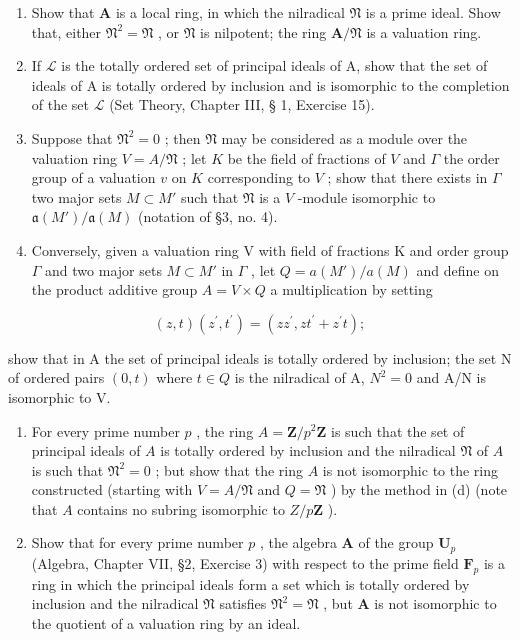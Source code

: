 \begin{enumerate}
\def\labelenumi{(\alph{enumi})}
\item
  Show that \(\mathbf{A}\) is a local ring, in which the nilradical \(\mathfrak{N}\) is a prime ideal. Show that, either \(\mathfrak{N}^2 = \mathfrak{N}\) , or \(\mathfrak{N}\) is nilpotent; the ring \(\mathbf{A} / \mathfrak{N}\) is a valuation ring.
\item
  If \(\mathcal{L}\) is the totally ordered set of principal ideals of A, show that the set of ideals of A is totally ordered by inclusion and is isomorphic to the completion of the set \(\mathcal{L}\) (Set Theory, Chapter III, § 1, Exercise 15).
\item
  Suppose that \(\mathfrak{N}^2 = 0\) ; then \(\mathfrak{N}\) may be considered as a module over the valuation ring \(V = A / \mathfrak{N}\) ; let \(K\) be the field of fractions of \(V\) and \(\Gamma\) the order group of a valuation \(v\) on \(K\) corresponding to \(V\) ; show that there exists in \(\Gamma\) two major sets \(M \subset M'\) such that \(\mathfrak{N}\) is a \(V\) -module isomorphic to \(\mathfrak{a}(M') / \mathfrak{a}(M)\) (notation of §3, no. 4).
\item
  Conversely, given a valuation ring V with field of fractions K and order group \(\Gamma\) and two major sets \(M \subset M'\) in \(\Gamma\) , let \(Q = a(M') / a(M)\) and define on the product additive group \(A = V \times Q\) a multiplication by setting
\end{enumerate}

\[
(z, t) (z ^ {\prime}, t ^ {\prime}) = (z z ^ {\prime}, z t ^ {\prime} + z ^ {\prime} t);
\]

show that in A the set of principal ideals is totally ordered by inclusion; the set N of ordered pairs \((0, t)\) where \(t \in Q\) is the nilradical of A, \(N^{2} = 0\) and A/N is isomorphic to V.

\begin{enumerate}
\def\labelenumi{(\alph{enumi})}
\setcounter{enumi}{4}
\item
  For every prime number \(p\) , the ring \(A = \mathbf{Z} / p^2\mathbf{Z}\) is such that the set of principal ideals of \(A\) is totally ordered by inclusion and the nilradical \(\mathfrak{N}\) of \(A\) is such that \(\mathfrak{N}^2 = 0\) ; but show that the ring \(A\) is not isomorphic to the ring constructed (starting with \(V = A / \mathfrak{N}\) and \(Q = \mathfrak{N}\) ) by the method in (d) (note that \(A\) contains no subring isomorphic to \(Z / p\mathbf{Z}\) ).
\item
  Show that for every prime number \(p\) , the algebra \(\mathbf{A}\) of the group \(\mathbf{U}_p\) (Algebra, Chapter VII, §2, Exercise 3) with respect to the prime field \(\mathbf{F}_p\) is a ring in which the principal ideals form a set which is totally ordered by inclusion and the nilradical \(\mathfrak{N}\) satisfies \(\mathfrak{N}^2 = \mathfrak{N}\) , but \(\mathbf{A}\) is not isomorphic to the quotient of a valuation ring by an ideal.
\end{enumerate}

